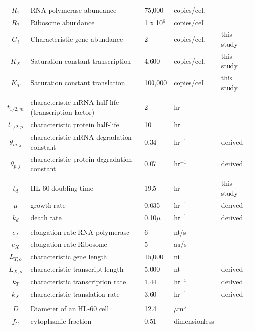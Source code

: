 \documentclass[12pt]{article}
\begin{document}
\begin{center}

	\label{tbl:model-parameters}
	\begin{scriptsize}
	\begin{supertabular}{c|l|l|l|l}
	\hline

	$R_{1}$ & RNA polymerase abundance & 75,000 & copies/cell & \cite{Jackson:2000aa,Zhao:2014aa} \\
	$R_{2}$ & Ribosome abundance & 1 x 10$^{6}$ & copies/cell & \cite{Freitas2004} \\
	$G_{i}$ & Characteristic gene abundance & 2 & copies/cell & this study\\
	$K_{X}$ & Saturation constant transcription & 4,600 & copies/cell & this study\\
	$K_{T}$ & Saturation constant translation & 100,000 & copies/cell & this study\\
	& & & & \\
	$t_{1/2,m}$ & characteristic mRNA half-life (transcription factor) & 2 & hr & \cite{Yang:2003aa} \\
	$t_{1/2,p}$ & characteristic protein half-life & 10 & hr & \cite{Doherty:2009aa} \\
	$\theta_{m,j}$ & characteristic mRNA degradation constant & 0.34 & hr$^{-1}$ & derived \\
	$\theta_{p,j}$ & characteristic protein degradation constant & 0.07 & hr$^{-1}$ & derived \\
	& & & & \\
	$t_{d}$ & HL-60 doubling time & 19.5 & hr & this study \\
	$\mu$ & growth rate & 0.035 & hr$^{-1}$ & derived \\
	$k_{d}$ & death rate & 0.10$\mu$ & hr$^{-1}$ & derived \\
	& & & & \\
	$e_{T}$ & elongation rate RNA polymerase & 6 & nt/s & \cite{Darzacq:2007aa} \\
	$e_{X}$ & elongation rate Ribosome & 5 & aa/s & \cite{Bostrom:1986aa} \\
	$L_{T,o}$ & characteristic gene length & 15,000 & nt & \cite{Meyers2004} \\
	$L_{X,o}$ & characteristic transcript length & 5,000 & nt & derived \\
	$k_{T}$ & characteristic transcription rate & 1.44 & hr$^{-1}$ & derived \\
	$k_{X}$ & characteristic translation rate & 3.60 & hr$^{-1}$ & derived \\
	& & & & \\
	$D$	& Diameter of an HL-60 cell & 12.4 & $\mu$m$^{3}$ & \cite{Rosenbluth:2006aa} \\
	$f_{C}$ & cytoplasmic fraction & 0.51 & dimensionless & \cite{Rosenbluth:2006aa} \\



\end{supertabular}
\end{scriptsize}
\end{center}
\end{document}
